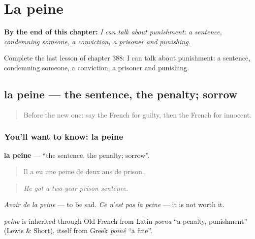 
\chapter{La peine}
\label{ch:fr-la-peine}

\begin{chapteropening}
\textbf{By the end of this chapter:} \emph{I can talk about punishment: a sentence, condemning someone, a conviction, a prisoner and punishing.}

Complete the last lesson of chapter 388: I can talk about punishment: a sentence, condemning someone, a conviction, a prisoner and punishing.
\end{chapteropening}

\section[la peine]{la peine — the sentence, the penalty; sorrow}

\label{lesson:FR-C388-peine}



\begin{quote}
Before the new one: say the French for guilty, then the French for innocent.
\end{quote}

\subsection*{You'll want to know: la peine}
\textbf{la peine} — \textquotedblleft{}the sentence, the penalty; sorrow\textquotedblright{}.

\begin{quote}
Il a eu une peine de deux ans de prison.
\end{quote}

\begin{quote}
\emph{He got a two-year prison sentence.}
\end{quote}

\emph{Avoir de la peine} — to be sad. \emph{Ce n'est pas la peine} — it is not worth it.

\begin{cousinweb}
\emph{peine} is inherited through Old French from Latin \emph{poena} \textquotedblleft{}a penalty, punishment\textquotedblright{} (Lewis \& Short), itself from Greek \emph{poin\'{\={e}}} \textquotedblleft{}a fine\textquotedblright{}.
\end{cousinweb}

